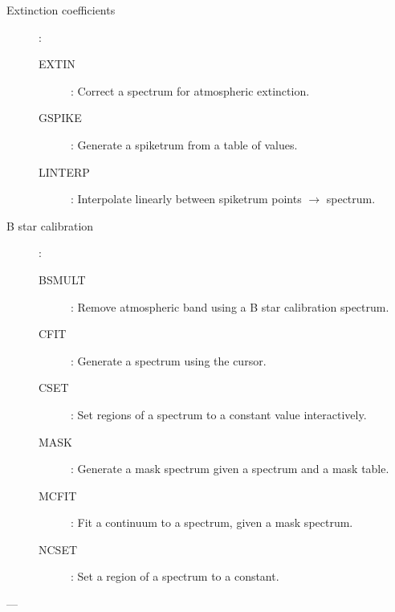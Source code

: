 \begin {description}
\begin{description}
\item [Extinction coefficients]\hspace{-1.5mm}:
\begin{description}
\item [EXTIN]: Correct a spectrum for atmospheric extinction.
\item [GSPIKE]: Generate a spiketrum from a table of values.
\item [LINTERP]: Interpolate linearly between spiketrum points $\rightarrow$ spectrum.
\end{description}

\item [B star calibration]\hspace{-1.5mm}:
\begin{description}
\item [BSMULT]: Remove atmospheric band using a B star calibration spectrum.
\item [CFIT]: Generate a spectrum using the cursor.
\item [CSET]: Set regions of a spectrum to a constant value interactively.
\item [MASK]: Generate a mask spectrum given a spectrum and a mask table.
\item [MCFIT]: Fit a continuum to a spectrum, given a mask spectrum.
\item [NCSET]: Set a region of a spectrum to a constant.
\end{description}
\end{description}

\item [MANIPULATION] ---


\end{description}
